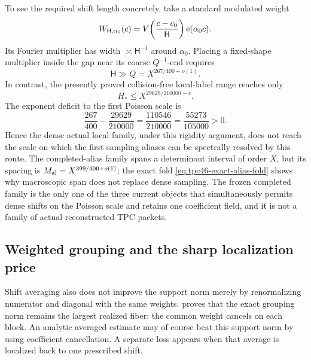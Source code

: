 To see the required shift length concretely, take a standard modulated
weight
\begin{equation}
 W_{\mathsf H,\alpha_0}(c)
 =V\!\left(\frac{c-c_0}{\mathsf H}\right)\mathrm e(\alpha_0c).
 \label{eq:tpc46-modulated-shift-weight}
\end{equation}
Its Fourier multiplier has width \(\asymp\mathsf H^{-1}\) around
\(\alpha_0\).  Placing a fixed-shape multiplier inside the gap near its
coarse \(Q^{-1}\)-end requires
\begin{equation}
 \mathsf H\gg Q=X^{267/400+o(1)}.
 \label{eq:tpc46-Poisson-required-window}
\end{equation}
In contrast, the presently proved collision-free local-label range
reaches only
\[
 H_*\le X^{29629/210000-\epsilon}.
\]
The exponent deficit to the first Poisson scale is
\begin{equation}
 \frac{267}{400}-\frac{29629}{210000}
 =\frac{110546}{210000}
 =\frac{55273}{105000}>0.
 \label{eq:tpc46-Poisson-local-deficit}
\end{equation}
Hence the dense actual local family, under this rigidity argument, does
not reach the scale on which the first sampling aliases can be
spectrally resolved by this route.
The completed-alias family spans a determinant interval of order \(X\),
but its spacing is \(M_{\rm al}=X^{399/400+o(1)}\); the exact fold
\eqref{eq:tpc46-exact-alias-fold} shows why macroscopic span does not
replace dense sampling.  The frozen completed family is the only one of
the three current objects that simultaneously permits dense shifts on
the Poisson scale and retains one coefficient field, and it is not a
family of actual reconstructed TPC packets.

\subsection{Weighted grouping and the sharp localization price}

Shift averaging also does not improve the support norm merely by
renormalizing numerator and diagonal with the same weights.
 proves that the exact grouping
norm remains the largest realized fiber: the common weight cancels on
each block.  An analytic averaged estimate may of course beat this
support norm by using coefficient cancellation.  A separate loss
appears when that average is localized back to one prescribed shift.


